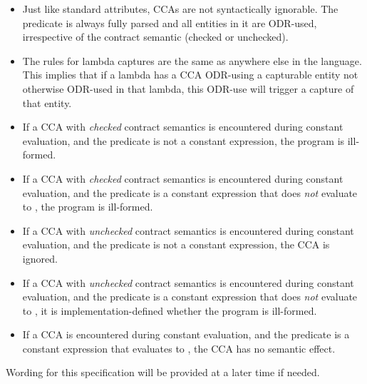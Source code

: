 \begin{itemize}
\item Just like standard attributes, CCAs are not syntactically ignorable. The predicate is always fully parsed and all entities in it are ODR-used, irrespective of the contract semantic (checked or unchecked).
\item The rules for lambda captures are the same as anywhere else in the language. This implies that if a lambda has a CCA ODR-using a capturable entity not otherwise ODR-used in that lambda, this ODR-use will trigger a capture of that entity.
\item If a CCA with \emph{checked} contract semantics is encountered during constant evaluation, and the predicate is not a constant expression, the program is ill-formed.
\item If a CCA with \emph{checked} contract semantics is encountered during constant evaluation, and the predicate is a constant expression that does \emph{not} evaluate to , the program is ill-formed.
\item If a CCA with \emph{unchecked} contract semantics is encountered during constant evaluation, and the predicate is not a constant expression, the CCA is ignored.
\item If a CCA with \emph{unchecked} contract semantics is encountered during constant evaluation, and the predicate is a constant expression that does \emph{not} evaluate to , it is implementation-defined whether the program is ill-formed.
\item If a CCA is encountered during constant evaluation, and the predicate is a constant expression that evaluates to , the CCA has no semantic effect.
\end{itemize}

Wording for this specification will be provided at a later time if needed.





\renewcommand{\bibname}{References}




